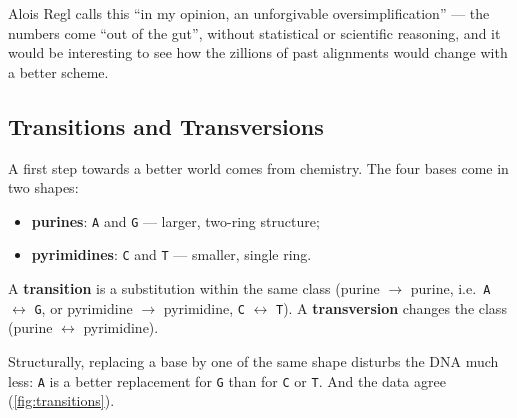 \documentclass[11pt, oneside]{book}
\newcommand{\seq}[1]{\texttt{#1}}
\let\originalsubsection\subsection
\renewcommand{\subsection}{\Needspace{6\baselineskip}\originalsubsection}
\begin{document}
Alois Regl calls this ``in my opinion, an unforgivable oversimplification''
--- the numbers come ``out of the gut'', without statistical or scientific
reasoning, and it would be interesting to see how the zillions of past
alignments would change with a better scheme.

\subsection{Transitions and Transversions}
\label{sec:transitions}

A first step towards a better world comes from chemistry. The four bases come
in two shapes:
\begin{itemize}
  \item \textbf{purines}: \seq{A} and \seq{G} --- larger, two-ring structure;
  \item \textbf{pyrimidines}: \seq{C} and \seq{T} --- smaller, single ring.
\end{itemize}

\begin{defbox}[title={Transition and transversion}]
A \textbf{transition} is a substitution within the same class (purine $\to$
purine, i.e.\ \seq{A} $\leftrightarrow$ \seq{G}, or pyrimidine $\to$
pyrimidine, \seq{C} $\leftrightarrow$ \seq{T}). A \textbf{transversion}
changes the class (purine $\leftrightarrow$ pyrimidine).
\end{defbox}

Structurally, replacing a base by one of the same shape disturbs the DNA much
less: \seq{A} is a better replacement for \seq{G} than for \seq{C} or
\seq{T}. And the data agree (\cref{fig:transitions}).
\end{document}
